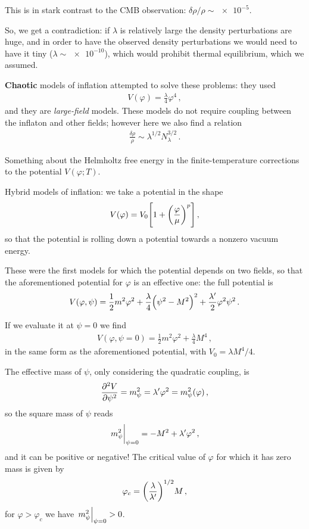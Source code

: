 \documentclass[main.tex]{subfiles}
\begin{document}
This is in stark contrast to the CMB observation: \(\delta \rho /\rho \sim \num{e-5}\). 

So, we get a contradiction: if \(\lambda \) is relatively large the density perturbations are huge, and in order to have the observed density perturbations we would need to have it tiny (\(\lambda \sim \num{e-10}\)), which would prohibit thermal equilibrium, which we assumed. 

\textbf{Chaotic} models of inflation attempted to solve these problems: they used 
%
\begin{align}
V(\varphi ) = \frac{\lambda}{4} \varphi^{4}
\,,
\end{align}
%
and they are \emph{large-field} models. 
These models do not require coupling between the inflaton and other fields; however here we also find a relation 
%
\begin{align}
\frac{ \delta \rho }{\rho } \sim \lambda^{1/2} N_\lambda^{3/2}
\,.
\end{align}

Something about the Helmholtz free energy in the finite-temperature corrections to the potential \(V(\varphi ; T)\). 

Hybrid models of inflation: we take a potential in the shape 
%
\begin{align}
V(\varphi ) = V_0 \qty[1 + \qty(\frac{\varphi }{\mu })^{p}]
\,,
\end{align}
%
so that the potential is rolling down a potential towards a nonzero vacuum energy. 

These were the first models for which the potential depends on two fields, so that the aforementioned potential for \(\varphi \) is an effective one: the full potential is 
%
\begin{align}
V(\varphi , \psi ) = \frac{1}{2} m^2\varphi^2+ \frac{\lambda}{4} \qty(\psi^2-M^2)^2 + \frac{\lambda'}{2} \varphi^2 \psi^2
\,.
\end{align}

If we evaluate it at \(\psi = 0\) we find 
%
\begin{align}
V(\varphi , \psi = 0) = \frac{1}{2} m^2\varphi^2 + \frac{\lambda}{4} M^{4}
\,,
\end{align}
%
in the same form as the aforementioned potential, with \(V_0 = \lambda M^{4} /4\). 

The effective mass of \(\psi \), only considering the quadratic coupling, is
%
\begin{align}
\pdv[2]{V}{\psi } = m^2_\psi = \lambda ' \varphi^2 = m^2_\psi (\varphi )
\,,
\end{align}
%
so the square mass of \(\psi \) reads 
%
\begin{align}
\eval{m^2_\psi}_{\psi = 0} = - M^2 + \lambda ' \varphi^2
\,,
\end{align}
%
and it can be positive or negative! The critical value of \(\varphi \) for which it has zero mass is given by 
%
\begin{align}
\varphi _c = \qty( \frac{\lambda }{\lambda'})^{1/2} M
\,,
\end{align}
%
for \(\varphi > \varphi _c\) we have \(\eval{m^2_\psi }_{\psi = 0} > 0\).
\end{document}
